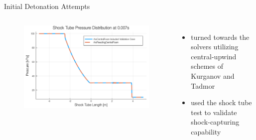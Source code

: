 \begin{frame}[allowframebreaks]{Initial Detonation Attempts}
\begin{columns}
\begin{figure}[]
\centering
\includegraphics[width=\linewidth]{../figs/shocktube.png} 
\end{figure}%

\begin{itemize}
\item turned towards the solvers utilizing central-upwind schemes of Kurganov and Tadmor \cite{kurganov1}
\item used the shock tube test to validate shock-capturing capability
\end{itemize}
\end{columns}
\end{frame}
